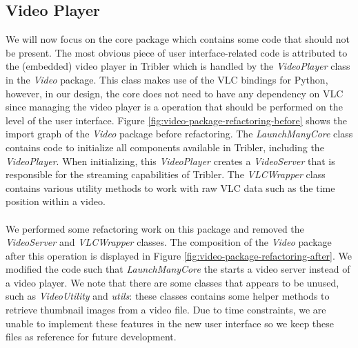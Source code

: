 \subsection{Video Player}
We will now focus on the core package which contains some code that should not be present. The most obvious piece of user interface-related code is attributed to the (embedded) video player in Tribler which is handled by the \emph{VideoPlayer} class in the \emph{Video} package. This class makes use of the VLC bindings for Python, however, in our design, the core does not need to have any dependency on VLC since managing the video player is a operation that should be performed on the level of the user interface. Figure \ref{fig:video-package-refactoring-before} shows the import graph of the  \emph{Video} package before refactoring. The \emph{LaunchManyCore} class contains code to initialize all components available in Tribler, including the \emph{VideoPlayer}. When initializing, this \emph{VideoPlayer} creates a \emph{VideoServer} that is responsible for the streaming capabilities of Tribler. The \emph{VLCWrapper} class contains various utility methods to work with raw VLC data such as the time position within a video.\\\\
We performed some refactoring work on this package and removed the \emph{VideoServer} and \emph{VLCWrapper} classes. The composition of the \emph{Video} package after this operation is displayed in Figure \ref{fig:video-package-refactoring-after}. We modified the code such that \emph{LaunchManyCore} the starts a video server instead of a video player. We note that there are some classes that appears to be unused, such as \emph{VideoUtility} and \emph{utils}: these classes contains some helper methods to retrieve thumbnail images from a video file. Due to time constraints, we are unable to implement these features in the new user interface so we keep these files as reference for future development.

